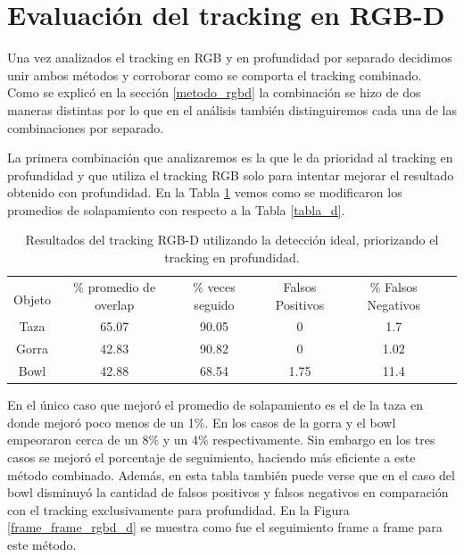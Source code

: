 \section{Evaluación del tracking en RGB-D}
Una vez analizados el tracking en RGB y en profundidad por separado decidimos unir ambos métodos y corroborar como se comporta el tracking combinado. Como se explicó en la sección \ref{metodo_rgbd} la combinación se hizo de dos maneras distintas por lo que en el análisis también distinguiremos cada una de las combinaciones por separado.

La primera combinación que analizaremos es la que le da prioridad al tracking en profundidad y que utiliza el tracking RGB solo para intentar mejorar el resultado obtenido con profundidad. En la Tabla \ref{tabla_rgbd_d} vemos como se modificaron los promedios de solapamiento con respecto a la Tabla \ref{tabla_d}.

\begin{table}[h]
	\centering
    \begin{tabular}{|c|c|c|c|c|c|}
    \hline
    & \multirow{2}{2.4cm}{\% promedio de overlap} & \multirow{2}{2cm}{\% veces seguido} & \multirow{2}{1.6cm}{Falsos Positivos} & \multirow{2}{1.6cm}{\% Falsos Negativos}\\
	Objeto & & & &\\
    \hline
    Taza   & 65.07      & 90.05     & 0        &   1.7 \\
    \hline
    Gorra  & 42.83      & 90.82     & 0        &  1.02 \\
    \hline
    Bowl   & 42.88      & 68.54     & 1.75     &  11.4 \\
    \hline
    \end{tabular}
\caption{Resultados del tracking RGB-D utilizando la detección ideal, priorizando el tracking en profundidad.}
\label{tabla_rgbd_d}
\end{table}

En el único caso que mejoró el promedio de solapamiento es el de la taza en donde mejoró poco menos de un 1\%. En los casos de la gorra y el bowl empeoraron cerca de un 8\% y un 4\% respectivamente. Sin embargo en los tres casos se mejoró el porcentaje de seguimiento, haciendo más eficiente a este método combinado. Además, en esta tabla también puede verse que en el caso del bowl disminuyó la cantidad de falsos positivos y falsos negativos en comparación con el tracking exclusivamente para profundidad. En la Figura \ref{frame_frame_rgbd_d} se muestra como fue el seguimiento frame a frame para este método.


